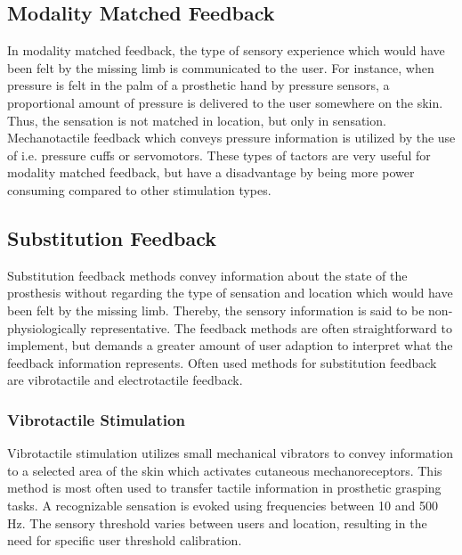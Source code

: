 \subsection{Modality Matched Feedback}

In modality matched feedback, the type of sensory experience which would have been felt by the missing limb is communicated to the user. For instance, when pressure is felt in the palm of a prosthetic hand by pressure sensors, a proportional amount of pressure is delivered to the user somewhere on the skin. Thus, the sensation is not matched in location, but only in sensation. Mechanotactile feedback which conveys pressure information is utilized by the use of i.e. pressure cuffs or servomotors. These types of tactors are very useful for modality matched feedback, but have a disadvantage by being more power consuming compared to other stimulation types. \cite{Schofield2014,Antfolk2018} 

\subsection{Substitution Feedback} \label{senssub}

Substitution feedback methods convey information about the state of the prosthesis without regarding the type of sensation and location which would have been felt by the missing limb. Thereby, the sensory information is said to be non-physiologically representative. The feedback methods are often straightforward to implement, but demands a greater amount of user adaption to interpret what the feedback information represents. Often used methods for substitution feedback are vibrotactile and electrotactile feedback. \cite{Schofield2014,Antfolk2018}     

\subsubsection{Vibrotactile Stimulation}

Vibrotactile stimulation utilizes small mechanical vibrators to convey information to a selected area of the skin which activates cutaneous mechanoreceptors. This method is most often used to transfer tactile information in prosthetic grasping tasks. \cite{Schofield2014} A recognizable sensation is evoked using frequencies between 10 and 500 Hz. The sensory threshold varies between users and location, resulting in the need for specific user threshold calibration. \cite{Antfolk2018}  


